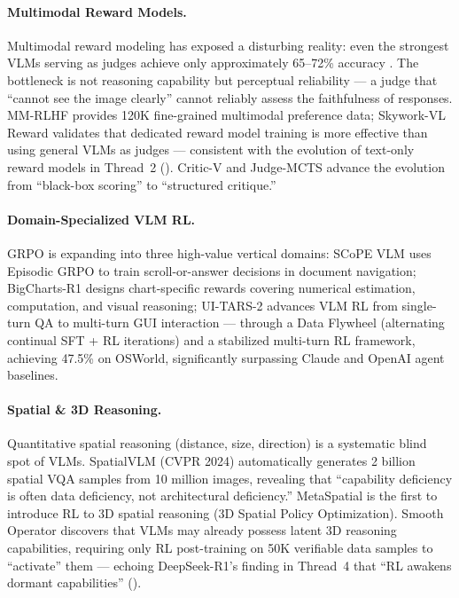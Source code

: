 \paragraph{Multimodal Reward Models.}
\label{sec:t5-reward-models}
Multimodal reward modeling has exposed a disturbing reality:
even the strongest VLMs serving as judges achieve only approximately 65--72\% accuracy
\cite{li2024vlrewardbench,yasunaga2025mmrewardbench}.
The bottleneck is not reasoning capability but perceptual reliability ---
a judge that ``cannot see the image clearly'' cannot reliably assess the faithfulness of responses.
MM-RLHF \cite{zhang2025mmrlhf} provides 120K fine-grained multimodal preference data;
Skywork-VL Reward \cite{wang2025skyworkvlreward} validates that
dedicated reward model training is more effective than using general VLMs as judges ---
consistent with the evolution of text-only reward models in Thread~2
().
Critic-V \cite{zhang2024criticv} and Judge-MCTS \cite{chen2026mjudgebench}
advance the evolution from ``black-box scoring'' to ``structured critique.''

\paragraph{Domain-Specialized VLM RL.}
\label{sec:t5-domain-rl}
GRPO is expanding into three high-value vertical domains:
SCoPE VLM \cite{lim2025scopevlm} uses Episodic GRPO to train scroll-or-answer decisions in document navigation;
BigCharts-R1 \cite{masry2025bigchartsr1} designs chart-specific rewards covering numerical estimation, computation, and visual reasoning;
UI-TARS-2 \cite{wang2025uitars2} advances VLM RL from single-turn QA to multi-turn GUI interaction ---
through a Data Flywheel (alternating continual SFT + RL iterations)
and a stabilized multi-turn RL framework,
achieving 47.5\% on OSWorld, significantly surpassing Claude and OpenAI agent baselines.

\paragraph{Spatial \& 3D Reasoning.}
\label{sec:t5-spatial-reasoning}
Quantitative spatial reasoning (distance, size, direction) is a systematic blind spot of VLMs.
SpatialVLM \cite{chen2024spatialvlm} (CVPR 2024) automatically generates 2 billion spatial VQA samples from 10 million images,
revealing that ``capability deficiency is often data deficiency, not architectural deficiency.''
MetaSpatial \cite{pan2025metaspatial} is the first to introduce RL to 3D spatial reasoning
(3D Spatial Policy Optimization).
Smooth Operator \cite{jiao2026smoothoperator} discovers that
VLMs may already possess latent 3D reasoning capabilities,
requiring only RL post-training on 50K verifiable data samples to ``activate'' them ---
echoing DeepSeek-R1's finding in Thread~4 that ``RL awakens dormant capabilities''
().

